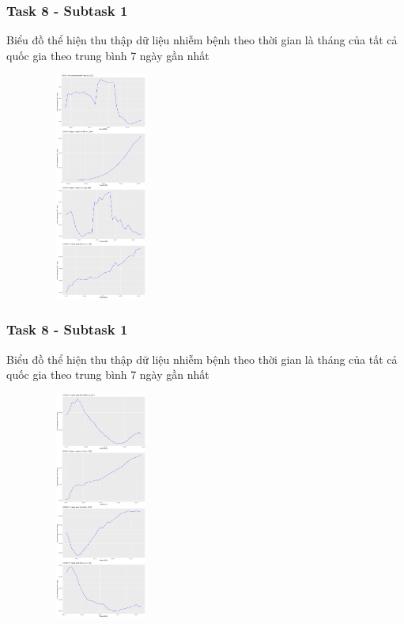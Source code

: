 \documentclass[english,10pt,table]{beamer}
\begin{document}
\frame
{
    \frametitle{Task 8 - Subtask 1}
    \begin{block}{Biểu đồ thể hiện thu thập dữ liệu nhiễm bệnh theo thời gian là tháng của tất cả quốc gia theo trung bình 7 ngày gần nhất}
    \begin{figure}[H]
			\centering
			\includegraphics[height=7.5cm,width=4.2cm]{images/8.1.1.png}
	\end{figure}
    \end{block}
}
\frame
{
    \frametitle{Task 8 - Subtask 1}
    \begin{block}{Biểu đồ thể hiện thu thập dữ liệu nhiễm bệnh theo thời gian là tháng của tất cả quốc gia theo trung bình 7 ngày gần nhất}
    \begin{figure}[H]
			\centering
			\includegraphics[height=7.5cm,width=4.2cm]{images/8.1.2.png}
	\end{figure}
    \end{block}
}
\frame
\end{document}
